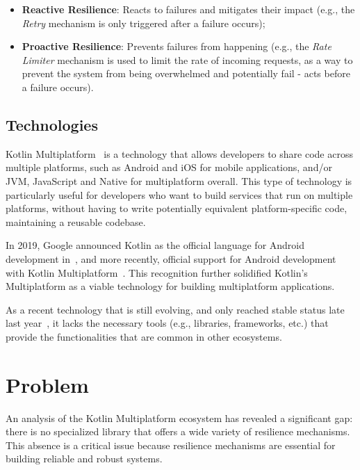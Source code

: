 \begin{itemize}
    \item \textbf{Reactive Resilience}: Reacts to failures and mitigates their impact (e.g., the \textit{Retry} mechanism is only triggered after a failure occurs);
    \item \textbf{Proactive Resilience}: Prevents failures from happening (e.g., the \textit{Rate Limiter} mechanism is used to limit the rate of incoming requests, as a way to prevent the system from being overwhelmed and potentially fail - acts before a failure occurs).
\end{itemize}

\subsection{Technologies}\label{subsec:technologies}

Kotlin Multiplatform~\cite{kotlin-multiplatform} is a technology that allows developers to share code across multiple platforms,
such as Android and iOS for mobile applications, and/or JVM, JavaScript and Native for multiplatform overall.
This type of technology is particularly useful for developers
who want to build services that run on multiple platforms,
without having to write potentially equivalent platform-specific code, maintaining a reusable codebase.

In 2019, Google announced Kotlin as the official language for Android development in~\cite{google-android-kotlin},
and more recently,
official support for Android development with Kotlin Multiplatform~\cite{android-kotlin-multiplatform, google-kotlin-multiplatform}.
This recognition further solidified Kotlin's Multiplatform as a viable technology for building multiplatform applications.

As a recent technology that is still evolving,
and only reached stable status late last year~\cite{kotlin-multiplatform-stable},
it lacks the necessary tools (e.g., libraries, frameworks, etc.)
that provide the functionalities that are common in other ecosystems.


\section{Problem}\label{sec:problem}

An analysis of the Kotlin Multiplatform ecosystem has revealed a significant gap:
there is no specialized library that offers a wide variety of resilience mechanisms.
This absence is a critical issue because resilience mechanisms are essential for building reliable and robust systems.

